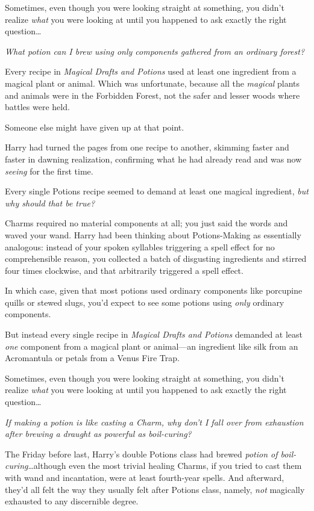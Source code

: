 Sometimes, even though you were looking straight at something, you didn’t
realize \emph{what} you were looking at until you happened to ask exactly the
right question…

\emph{What potion can I brew using only components gathered from an ordinary
forest?}

Every recipe in \emph{Magical Drafts and Potions} used at least one ingredient
from a magical plant or animal. Which was unfortunate, because all the
\emph{magical} plants and animals were in the Forbidden Forest, not the safer
and lesser woods where battles were held.

Someone else might have given up at that point.

Harry had turned the pages from one recipe to another, skimming faster and
faster in dawning realization, confirming what he had already read and was now
\emph{seeing} for the first time.

Every single Potions recipe seemed to demand at least one magical ingredient,
\emph{but why should that be true?}

Charms required no material components at all; you just said the words and
waved your wand. Harry had been thinking about Potions-Making as essentially
analogous: instead of your spoken syllables triggering a spell effect for no
comprehensible reason, you collected a batch of disgusting ingredients and
stirred four times clockwise, and that arbitrarily triggered a spell effect.

In which case, given that most potions used ordinary components like porcupine
quills or stewed slugs, you’d expect to see some potions using \emph{only}
ordinary components.

But instead every single recipe in \emph{Magical Drafts and Potions} demanded
at least \emph{one} component from a magical plant or animal—an ingredient
like silk from an Acromantula or petals from a Venus Fire Trap.

Sometimes, even though you were looking straight at something, you didn’t
realize \emph{what} you were looking at until you happened to ask exactly the
right question…

\emph{If making a potion is like casting a Charm, why don’t I fall over from
exhaustion after brewing a draught as powerful as boil-curing?}

The Friday before last, Harry’s double Potions class had brewed \emph{potion of
boil-curing}…although even the most trivial healing Charms, if you
tried to cast them with wand and incantation, were at least fourth-year spells.
And afterward, they’d all felt the way they usually felt after Potions class,
namely, \emph{not} magically exhausted to any discernible degree.

